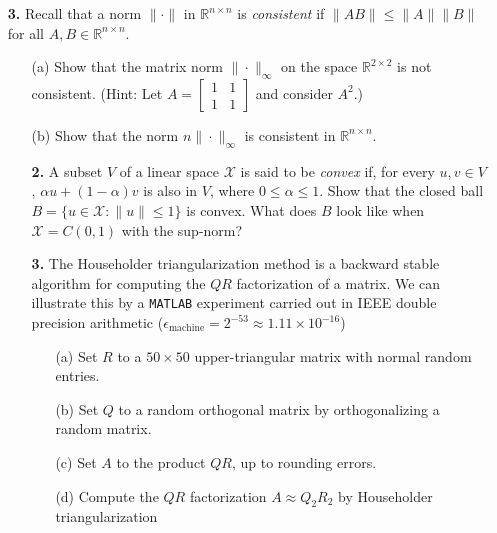 \documentclass[10pt]{report}
\begin{document}
\begin{enumerate}
\begin{enumerate}
\end{enumerate}


\item[\textbf{3.}]  Recall that a norm $\|\cdot\|$ in $\mathbb{R}^{n \times n}$ is \textit{consistent} if $\|AB\| \leq \|A\| \|B\|$ for all $A, B \in \mathbb{R}^{n \times n}$. 
\begin{enumerate} 
\item[(a)]Show that the matrix norm $\|\cdot\|_\infty$ on the space $\mathbb{R}^{2 \times 2}$ is not consistent. 
(Hint: Let $A= \left[\begin{smallmatrix} 1&1\\1&1 \end{smallmatrix}\right]$ and consider $A^2$.)
\item[(b)] Show that the norm $n\|\cdot\|_{\infty}$ is consistent in $\mathbb{R}^{n \times n}$.

\vspace{0.7cm}
\item[\textbf{2.}] A subset $V$ of a linear space $\mathcal{X}$ is
 said to be \textit{convex} if, for every $u,v\in V$, $\alpha u+(1-
 \alpha)v$ is also in $V$, where $0\leq\alpha\leq1$. Show that the
 closed ball $B=\{u\in\mathcal{X}:\|u\|\leq1\}$ is convex. What does $B$ look
 like when $\mathcal{X}=C(0,1)$ with the sup-norm?\\
\begin{center}
\end{center}










\vspace{0.7cm}

\item[\textbf{3.}] The Householder triangularization method is a backward stable algorithm
  for computing the $QR$ factorization of a matrix. We can illustrate this by a \verb+MATLAB+
  experiment carried out in IEEE double precision arithmetic
  ($\epsilon_{\text{machine}}=2^{-53}\approx 1.11\times10^{-16}$)

  \begin{enumerate}
    \item[(a)] Set $R$ to a $50\times50$ upper-triangular matrix with normal
    random entries.
    \item[(b)] Set $Q$ to a random orthogonal matrix by orthogonalizing a random
    matrix.
    \item[(c)] Set $A$ to the product $QR$, up to rounding errors.
    \item[(d)] Compute the $QR$ factorization $A\approx Q_2R_2$ by Householder
    triangularization 
  \end{enumerate}


\end{enumerate}
\end{enumerate}
\end{document}
